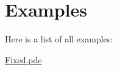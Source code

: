 \section{Examples}
Here is a list of all examples:\begin{DoxyCompactItemize}
\item 
\hyperlink{_fixed_8pde-example}{Fixed.pde}
\end{DoxyCompactItemize}
